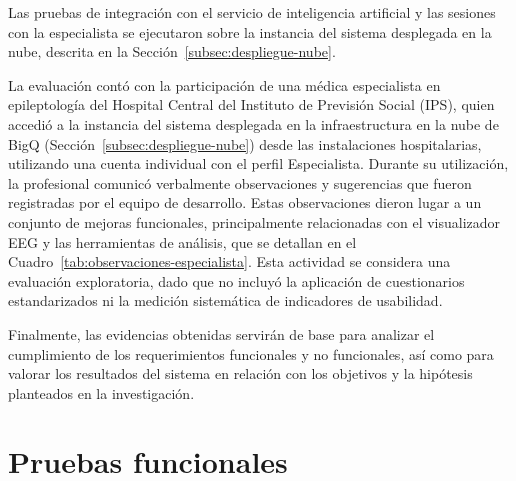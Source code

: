 Las pruebas de integración con el servicio de inteligencia artificial y las sesiones con la especialista se ejecutaron sobre la instancia del sistema desplegada en la nube, descrita en la Sección~\ref{subsec:despliegue-nube}.

La evaluación contó con la participación de una médica especialista en epileptología del Hospital Central del Instituto de Previsión Social (IPS), quien accedió a la instancia del sistema desplegada en la infraestructura en la nube de BigQ (Sección~\ref{subsec:despliegue-nube}) desde las instalaciones hospitalarias, utilizando una cuenta individual con el perfil Especialista. Durante su utilización, la profesional comunicó verbalmente observaciones y sugerencias que fueron registradas por el equipo de desarrollo. Estas observaciones dieron lugar a un conjunto de mejoras funcionales, principalmente relacionadas con el visualizador EEG y las herramientas de análisis, que se detallan en el Cuadro~\ref{tab:observaciones-especialista}. Esta actividad se considera una evaluación exploratoria, dado que no incluyó la aplicación de cuestionarios estandarizados ni la medición sistemática de indicadores de usabilidad.

Finalmente, las evidencias obtenidas servirán de base para analizar el cumplimiento de los requerimientos funcionales y no funcionales, así como para valorar los resultados del sistema en relación con los objetivos y la hipótesis planteados en la investigación.

\section{Pruebas funcionales}
\label{sec:pruebas_funcionales}

